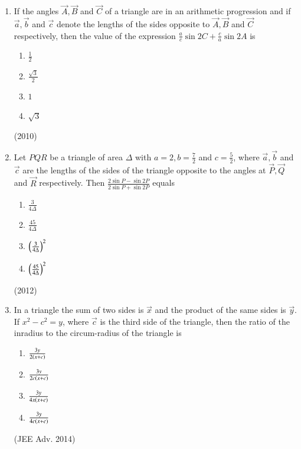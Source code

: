 \documentclass[journal]{IEEEtran}
\begin{document}
\begin{enumerate}
\item If the angles $\vec{A}, \vec{B}$ and $\vec{C}$ of a triangle are in an arithmetic progression and if $\vec{a}, \vec{b}$ and $\vec{c}$ denote the lengths of the sides opposite to $\vec{A}, \vec{B}$ and $\vec{C}$ respectively, then the value of the expression $\frac{a}{c}\sin 2C + \frac{c}{a} \sin 2A$ is
\begin{enumerate}
\item $\frac{1}{2}$
\item $\frac{\sqrt{3}}{2}$
\item $1$
\item $\sqrt{3}$
\end{enumerate}
\hfill (2010)

\item Let $PQR$ be a triangle of area $\Delta$ with $a=2, b= \frac{7}{2}$ and $c=\frac{5}{2}$, where $\vec{a}, \vec{b}$ and $\vec{c}$ are the lengths of the sides of the triangle opposite to the angles at $\vec{P}, \vec{Q}$ and $\vec{R}$ respectively. Then $\frac{2\sin P - \sin 2P}{2\sin P + \sin 2P}$ equals
\begin{enumerate}
\item $\frac{3}{4\Delta}$
\item $\frac{45}{4\Delta}$
\item $\left(\frac{3}{4\Delta}\right)^2$
\item $\left(\frac{45}{4\Delta}\right)^2$
\end{enumerate}
\hfill (2012)

\item In a triangle the sum of two sides is $\vec{x}$ and the product of the same sides is $\vec{y}$. If $x^2-c^2=y$, where $\vec{c}$ is the third side of the triangle, then the ratio of the inradius to the circum-radius of the triangle is
\begin{enumerate}
\item $\frac{3y}{2\left(x+c\right)}$
\item $\frac{3y}{2c\left(x+c\right)}$
\item $\frac{3y}{4x\left(x+c\right)}$
\item $\frac{3y}{4c\left(x+c\right)}$
\end{enumerate}
\hfill (JEE Adv. 2014)

\end{enumerate}
\end{document}
